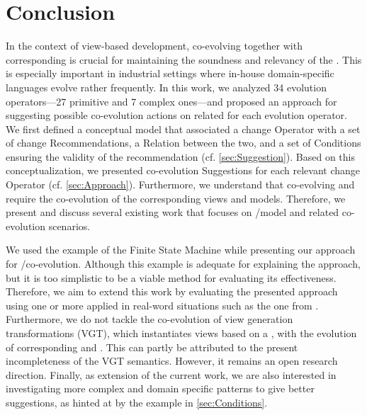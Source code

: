 \section{Conclusion} \label{sec:Conclusion}

In the context of view-based development, co-evolving \viewtypes together with corresponding \metamodels is crucial for maintaining the soundness and relevancy of the \viewtypes. This is especially important in industrial settings where in-house domain-specific languages evolve rather frequently. In this work, we 
analyzed 34 \metamodel evolution operators---27 primitive and 7 complex ones---and proposed an approach for suggesting possible co-evolution actions on related \viewtypes for each \metamodel evolution operator. We first defined a conceptual model that associated a \metamodel change \textsf{Operator} with a set of \viewtype change \textsf{Recommendation}s, a \textsf{Relation} between the two, and a set of \textsf{Conditions}
ensuring the validity of the recommendation (cf. \cref{sec:Suggestion}). Based on this conceptualization, we presented \viewtype co-evolution \textsf{Suggestion}s for each relevant \metamodel change \textsf{Operator} (cf. \cref{sec:Approach}). Furthermore, we understand that co-evolving \viewtypes and \metamodels require the co-evolution of the corresponding views and models. Therefore, we present and discuss several existing work that focuses on \metamodel/model and related co-evolution scenarios. 

We used the example of the Finite State Machine while presenting our approach for \viewtype/\metamodel co-evolution. Although this example is adequate for explaining the approach, but it is too simplistic to be a viable method for evaluating its effectiveness.
Therefore, we aim to extend this work by evaluating the presented approach using one or more \metamodels applied in real-word situations such as the one from \textcite{braun_classification_2014}. Furthermore, we do not tackle the co-evolution of view generation transformations (VGT), which instantiates views based on a \viewtype, with the evolution of corresponding \viewtypes and \metamodels. This can partly be attributed to the present incompleteness of the VGT semantics. However, it remains an open research direction. Finally, as extension of the current work, we are also interested in investigating more complex and domain specific patterns to give better suggestions, as hinted at by the example in \cref{sec:Conditions}.

